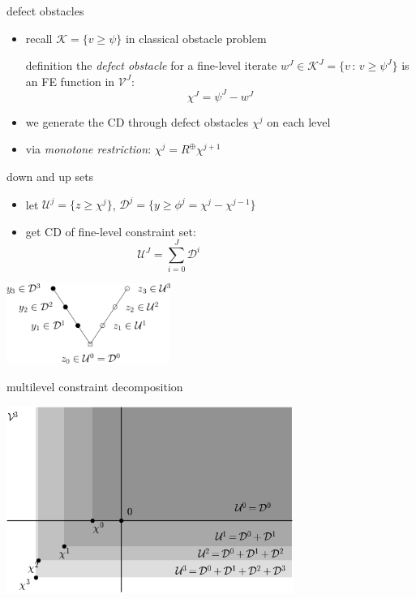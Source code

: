 \documentclass[svgnames,
               hyperref={colorlinks,citecolor=DeepPink4,linkcolor=FireBrick,urlcolor=Maroon},
               usepdftitle=false]  %
               {beamer}
\newcommand{\ds}{\displaystyle}
\begin{document}
\begin{frame}{defect obstacles}

\begin{itemize}
\item recall $\mathcal{K} = \{v \ge \psi\}$ in classical obstacle problem
\begin{block}{definition}
the \emph{defect obstacle} for a fine-level iterate $w^J \in \mathcal{K}^J = \{v\,:\,v\ge \psi^J\}$ is an FE function in $\mathcal{V}^J$:
    $$\chi^J = \psi^J - w^J$$
\end{block}
\item we generate the CD through defect obstacles $\chi^j$ on each level
\item via \emph{monotone restriction}: \quad $\ds \chi^j = R^{\oplus} \chi^{j+1}$
\end{itemize}

\begin{center}

\end{center}
\end{frame}


\begin{frame}{down and up sets}

\begin{itemize}
\item let $\mathcal{U}^j = \{z \ge \chi^j\}$, $\mathcal{D}^j = \{y \ge \phi^j=\chi^j - \chi^{j-1}\}$
\item get CD of fine-level constraint set:
	$$\mathcal{U}^J = \sum_{i=0}^J \mathcal{D}^i \phantom{KLDFJSKJDS SDF}$$
\end{itemize}

\begin{center}
\includegraphics[width=0.4\textwidth]{../talk-oxford/images/fascd-vcycle.png}
\end{center}
\end{frame}


\begin{frame}{multilevel constraint decomposition}

\centering
\includegraphics[width=0.7\textwidth]{figs/innerconeapprox.png}
\end{frame}
\end{document}
